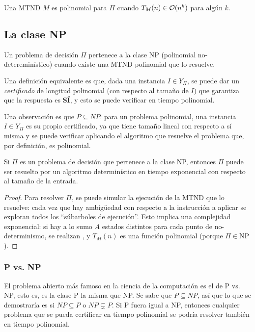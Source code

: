 Una MTND $M$ es polinomial para $\Pi$ cuando $T_M(n) \in \mathcal{O}(n^k)$ para algún $k$.

\subsection{La clase NP}

Un problema de decisión $\Pi$ pertenece a la clase NP (polinomial no-detereminístico) cuando existe una MTND polinomial que lo resuelve.

Una definición equivalente es que, dada una instancia $I \in Y_{\Pi}$, se puede dar un \textit{certificado} de longitud polinomial (con respecto al tamaño de $I$) que garantiza que la respuesta es \textbf{SÍ}, y esto se puede verificar en tiempo polinomial.

Una observación es que $P \subseteq NP$: para un problema polinomial, una instancia $I \in Y_{\Pi}$ es su propio certificado, ya que tiene tamaño lineal con respecto a sí misma y se puede verificar aplicando el algoritmo que resuelve el problema que, por definición, es polinomial.

\begin{theorem*}
    Si $\Pi$ es un problema de decisión que pertenece a la clase NP, entonces $\Pi$ puede ser resuelto por un algoritmo determinístico en tiempo exponencial con respecto al tamaño de la entrada.
\end{theorem*}
\begin{proof}
    Para resolver $\Pi$, se puede simular la ejecución de la MTND que lo resuelve: cada vez que hay ambigüedad con respecto a la instrucción a aplicar se exploran todos los ``súbarboles de ejecución''. Esto implica una complejidad exponencial: si hay a lo sumo $A$ estados distintos para cada punto de no-determinismo, se realizan , y $T_M(n)$ es una función polinomial (porque $\Pi \in \text{NP}$).
\end{proof}

\subsubsection{P vs. NP}

El problema abierto más famoso en la ciencia de la computación es el de P vs. NP, esto es, es la clase P la misma que NP. Se sabe que $P \subseteq NP$, así que lo que se demostraría es si $NP \subseteq P$ o $NP \subsetneq P$. Si P fuera igual a NP, entonces cualquier problema que se pueda certificar en tiempo polinomial se podría resolver también en tiempo polinomial.

